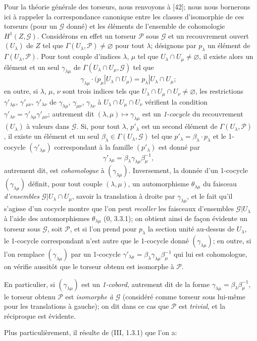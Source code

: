 \begin{env}[16.5.15]
Pour la théorie générale des torseurs, nous renvoyons à [42]; nous nous
bornerons ici à rappeler la correspondance canonique entre les classes
d'isomorphie de ces torseurs (pour un $\mathscr{G}$ donné) et les éléments de
l'ensemble de cohomologie $H^1(Z,\mathscr{G})$. Considérons en effet un
torseur $\mathscr{P}$ sous $\mathscr{G}$ et un recouvrement ouvert
$(U_\lambda)$ de $Z$ tel que
$\Gamma(U_\lambda,\mathscr{P})\neq\varnothing$ pour tout $\lambda$;
désignons par $p_\lambda$ un élément de
$\Gamma(U_\lambda,\mathscr{P})$. Pour tout couple d'indices $\lambda$, $\mu$
tel que $U_\lambda\cap U_\mu\neq\varnothing$, il existe alors un élément et
un seul $\gamma_{\lambda\mu}$ de
$\Gamma(U_\lambda\cap U_\mu,\mathscr{G})$ tel que
\[
  \gamma_{\lambda\mu}\cdot
  (p_\mu|U_\lambda\cap U_\mu)=p_\lambda|U_\lambda\cap U_\mu;
\]
en outre, si $\lambda$, $\mu$, $\nu$ sont trois indices tels que
$U_\lambda\cap U_\mu\cap U_\nu\neq\varnothing$, les restrictions
$\gamma'_{\lambda\mu}$, $\gamma'_{\mu\nu}$, $\gamma'_{\lambda\nu}$ de
$\gamma_{\lambda\mu}$, $\gamma_{\mu\nu}$, $\gamma_{\lambda\nu}$ à
$U_\lambda\cap U_\mu\cap U_\nu$ vérifient la condition
$\gamma'_{\lambda\nu}=\gamma'_{\lambda\mu}\gamma'_{\mu\nu}$; autrement dit
$(\lambda,\mu)\mapsto\gamma_{\lambda\mu}$ est un \emph{1-cocycle} du
recouvrement $(U_\lambda)$ à valeurs dans $\mathscr{G}$. Si, pour tout
$\lambda$, $p'_\lambda$ est un second élément de
$\Gamma(U_\lambda,\mathscr{P})$, il existe un élément et un seul
$\beta_\lambda\in\Gamma(U_\lambda,\mathscr{G})$ tel que
$p'_\lambda=\beta_\lambda\cdot p_\lambda$ et le 1-cocycle
$(\gamma'_{\lambda\mu})$ correspondant à la famille $(p'_\lambda)$ est donné
par
\[
  \gamma'_{\lambda\mu}=\beta_\lambda\gamma_{\lambda\mu}\beta_\mu^{-1},
\]
autrement dit, est \emph{cohomologue} à $(\gamma_{\lambda\mu})$.
Inversement, la donnée d'un 1-cocycle $(\gamma_{\lambda\mu})$ définit, pour
tout couple $(\lambda,\mu)$, un automorphisme $\theta_{\lambda\mu}$ du
faisceau \emph{d'ensembles}
$\mathscr{G}|U_\lambda\cap U_\mu$, savoir la translation à droite par
$\gamma_{\lambda\mu}$, et le fait qu'il s'agisse d'un cocycle montre que l'on
peut \emph{recoller} les faisceaux d'ensembles $\mathscr{G}|U_\lambda$ à
l'aide des automorphismes $\theta_{\lambda\mu}$ (0, 3.3.1); on obtient ainsi
de façon évidente un torseur sous $\mathscr{G}$, soit $\mathscr{P}$, et si
l'on prend pour $p_\lambda$ la section unité au-dessus de $U_\lambda$, le
1-cocycle correspondant n'est autre que le 1-cocycle donné
$(\gamma_{\lambda\mu})$; en outre, si l'on remplace
$(\gamma_{\lambda\mu})$ par un 1-cocycle
$\gamma'_{\lambda\mu}=\beta_\lambda\gamma_{\lambda\mu}\beta_\mu^{-1}$ qui
lui est cohomologue, on vérifie aussitôt que le torseur obtenu est isomorphe
à $\mathscr{P}$.

En particulier, si $(\gamma_{\lambda\mu})$ est un \emph{1-cobord}, autrement
dit de la forme
$\gamma_{\lambda\mu}=\beta_\lambda\beta_\mu^{-1}$, le torseur obtenu
$\mathscr{P}$ est \emph{isomorphe à $\mathscr{G}$} (considéré comme torseur
sous lui-même pour les translations à gauche); on dit dans ce cas que
$\mathscr{P}$ est \emph{trivial}, et la réciproque est évidente.

Plus particulièrement, il résulte de (III, 1.3.1) que l'on a:
\end{env}

